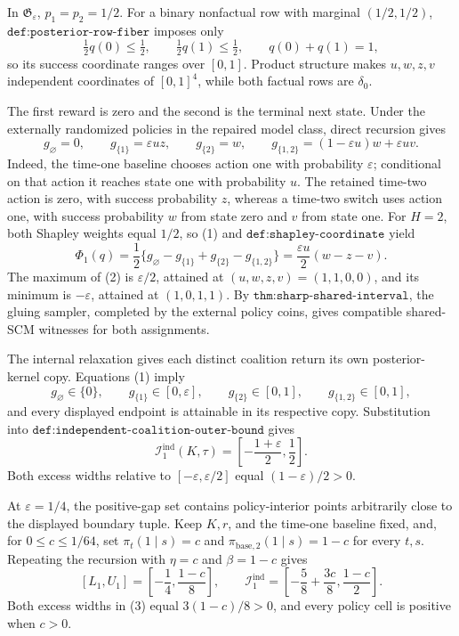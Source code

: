 In \(\mathfrak G_\varepsilon\), \(p_1=p_2=1/2\).  For a binary nonfactual row with marginal \((1/2,1/2)\), \(\texttt{def:posterior-row-fiber}\) imposes only
\[
 \tfrac12q(0)\le\tfrac12,\qquad \tfrac12q(1)\le\tfrac12,
 \qquad q(0)+q(1)=1,
\]
so its success coordinate ranges over \([0,1]\).  Product structure makes \(u,w,z,v\) independent coordinates of \([0,1]^4\), while both factual rows are \(\delta_0\).

The first reward is zero and the second is the terminal next state.  Under the externally randomized policies in the repaired model class, direct recursion gives
\[
 g_\varnothing=0,
 \qquad g_{\{1\}}=\varepsilon uz,
 \qquad g_{\{2\}}=w,
 \qquad g_{\{1,2\}}=(1-\varepsilon u)w+\varepsilon uv. \tag{1}
\]
Indeed, the time-one baseline chooses action one with probability \(\varepsilon\); conditional on that action it reaches state one with probability \(u\).  The retained time-two action is zero, with success probability \(z\), whereas a time-two switch uses action one, with success probability \(w\) from state zero and \(v\) from state one.  For \(H=2\), both Shapley weights equal \(1/2\), so (1) and \(\texttt{def:shapley-coordinate}\) yield
\[
 \Phi_1(q)=\frac12\{g_\varnothing-g_{\{1\}}+g_{\{2\}}-g_{\{1,2\}}\}
 =\frac{\varepsilon u}{2}(w-z-v). \tag{2}
\]
The maximum of (2) is \(\varepsilon/2\), attained at \((u,w,z,v)=(1,1,0,0)\), and its minimum is \(-\varepsilon\), attained at \((1,0,1,1)\).  By \(\texttt{thm:sharp-shared-interval}\), the gluing sampler, completed by the external policy coins, gives compatible shared-SCM witnesses for both assignments.

The internal relaxation gives each distinct coalition return its own posterior-kernel copy.  Equations (1) imply
\[
 g_\varnothing\in\{0\},\qquad g_{\{1\}}\in[0,\varepsilon],
 \qquad g_{\{2\}}\in[0,1],\qquad g_{\{1,2\}}\in[0,1],
\]
and every displayed endpoint is attainable in its respective copy.  Substitution into \(\texttt{def:independent-coalition-outer-bound}\) gives
\[
 \mathcal I_1^{\mathrm{ind}}(K,\tau)
 =\left[-\frac{1+\varepsilon}{2},\frac12\right].
\]
Both excess widths relative to \([-\varepsilon,\varepsilon/2]\) equal \((1-\varepsilon)/2>0\).

At \(\varepsilon=1/4\), the positive-gap set contains policy-interior points arbitrarily close to the displayed boundary tuple.  Keep \(K,r\), and the time-one baseline fixed, and, for \(0\le c\le1/64\), set \(\pi_t(1\mid s)=c\) and \(\pi_{\mathrm{base},2}(1\mid s)=1-c\) for every \(t,s\).  Repeating the recursion with \(\eta=c\) and \(\beta=1-c\) gives
\[
 [L_1,U_1]=\left[-\frac14,\frac{1-c}{8}\right],
 \qquad
 \mathcal I_1^{\mathrm{ind}}
 =\left[-\frac58+\frac{3c}{8},\frac{1-c}{2}\right]. \tag{3}
\]
Both excess widths in (3) equal \(3(1-c)/8>0\), and every policy cell is positive when \(c>0\).

